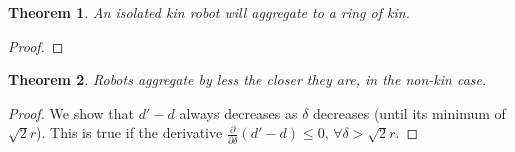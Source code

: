 \documentclass[conference]{IEEEtran}
\newtheorem{theorem}{Theorem}
\begin{document}
  \begin{theorem} \label{thm:aggregation_with_ring_of_kin}
    An isolated kin robot will aggregate to a ring of kin.
  \end{theorem}
  \begin{proof}
  \end{proof}

  \pagebreak


  \begin{theorem} \label{thm:decrease2}
    Robots aggregate by less the closer they are, in the non-kin case.
  \end{theorem}
  \begin{proof}

    We show that $d'-d$ always decreases as $\delta$ decreases (until its minimum of $\sqrt{2}r$). This is true if the derivative $\frac{\partial}{\partial\delta}(d'-d) \leq 0$, $\forall \delta>\sqrt{2}r$.


\end{proof}
\end{document}
